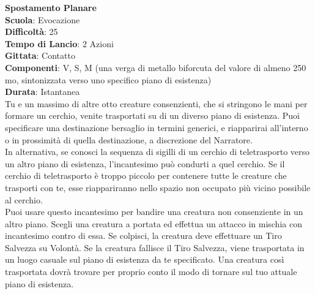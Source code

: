 \begin{multicols}{2}
\medskip\textbf{Spostamento Planare}\\
\textbf{Scuola}: Evocazione\\
\textbf{Difficoltà}: 25\\
\textbf{Tempo di Lancio}: 2 Azioni\\
\textbf{Gittata}: Contatto\\
\textbf{Componenti}: V, S, M (una verga di metallo biforcuta del valore di almeno 250 mo, sintonizzata verso uno specifico piano di esistenza)\\
\textbf{Durata}: Istantanea\\
Tu e un massimo di altre otto creature consenzienti, che si stringono le mani per formare un cerchio, venite trasportati su di un diverso piano di esistenza. Puoi specificare una destinazione bersaglio in termini generici, e riapparirai all'interno o in prossimità di quella destinazione, a discrezione del Narratore.\\
In alternativa, se conosci la sequenza di sigilli di un cerchio di teletrasporto verso un altro piano di esistenza, l'incantesimo può condurti a quel cerchio. Se il cerchio di teletrasporto è troppo piccolo per contenere tutte le creature che trasporti con te, esse riappariranno nello spazio non occupato più vicino possibile al cerchio.\\
Puoi usare questo incantesimo per bandire una creatura non consenziente in un altro piano. Scegli una creatura a portata ed effettua un attacco in mischia con incantesimo contro di essa. Se colpisci, la creatura deve effettuare un Tiro Salvezza su Volontà. Se la creatura fallisce il Tiro Salvezza, viene trasportata in un luogo casuale sul piano di esistenza da te specificato. Una creatura così trasportata dovrà trovare per proprio conto il modo di tornare sul tuo attuale piano di esistenza.


\end{multicols}
